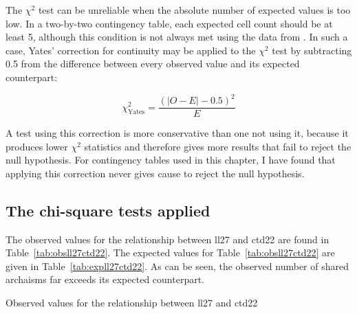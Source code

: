 
The \(\chi^2\) test can be unreliable when the absolute number of expected values is too low. In a two-by-two contingency table, each expected cell count should be at least 5, although this condition is not always met using the data from . In such a case, Yates' correction for continuity may be applied to the \(\chi^2\) test by subtracting 0.5 from the difference between every observed value and its expected counterpart:

\[\chi_\text{Yates}^2 =  \frac{(|O - E| - 0.5)^2}{E}\]

A test using this correction is more conservative than one not using it, because it produces lower \(\chi^2\) statistics and therefore gives more results that fail to reject the null hypothesis. For contingency tables used in this chapter, I have found that applying this correction never gives cause to reject the null hypothesis.

\subsection{The chi-square tests applied}
\label{sec:chisqapplied}

The observed values for the relationship between \gls{ll27} and \gls{ctd22} are found in Table~\ref{tab:obsll27ctd22}. 
The expected values for Table~\ref{tab:obsll27ctd22} are given in Table~\ref{tab:expll27ctd22}. As can be seen, the observed number of shared archaisms far exceeds its expected counterpart.

\begin{table}[h]
  \centering
  
  \caption{Observed values for the relationship between \acrshort{ll27} and \acrshort{ctd22}}
  \label{tab:obsll27ctd22}
\end{table}



